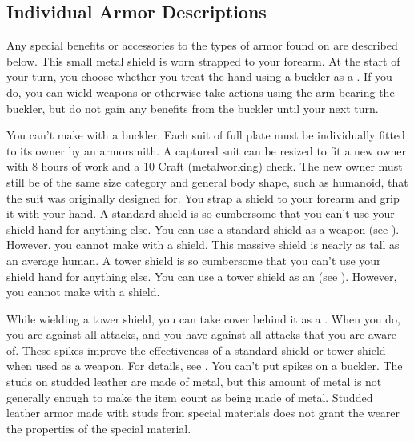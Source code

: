   \subsection{Individual Armor Descriptions}
    Any special benefits or accessories to the types of armor found on  are described below.
     This small metal shield is worn strapped to your forearm.
    At the start of your turn, you choose whether you treat the hand using a buckler as a .
    If you do, you can wield weapons or otherwise take actions using the arm bearing the buckler, but do not gain any benefits from the buckler until your next turn.
    \par You can't make  with a buckler.
     Each suit of full plate must be individually fitted to its owner by an armorsmith.
    A captured suit can be resized to fit a new owner with 8 hours of work and a  10 Craft (metalworking) check.
    The new owner must still be of the same size category and general body shape, such as humanoid, that the suit was originally designed for.
     You strap a shield to your forearm and grip it with your hand.
    A standard shield is so cumbersome that you can't use your shield hand for anything else.
    You can use a standard shield as a weapon (see ).
    However, you cannot make  with a shield.
     This massive shield is nearly as tall as an average human.
    A tower shield is so cumbersome that you can't use your shield hand for anything else.
    You can use a tower shield as an  (see ).
    However, you cannot make  with a shield.

    While wielding a tower shield, you can take cover behind it as a .
    When you do, you \briefly are \shielded against all attacks, and you have  against all attacks that you are aware of.
     These spikes improve the effectiveness of a standard shield or tower shield when used as a weapon.
    For details, see .
    You can't put spikes on a buckler.
     The studs on studded leather are made of metal, but this amount of metal is not generally enough to make the item count as being made of metal.
    Studded leather armor made with studs from special materials does not grant the wearer the properties of the special material.

